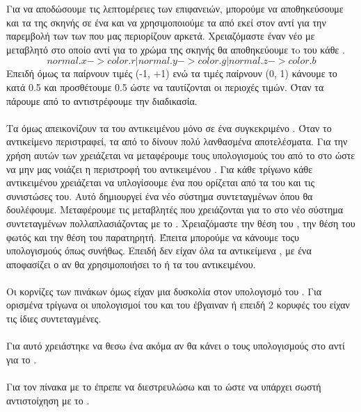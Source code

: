 \documentclass[11pt]{scrartcl} %
\begin{document}
Για να αποδώσουμε τις λεπτομέρειες των επιφανειών, μπορούμε να αποθηκεύσουμε και τα  της σκηνής σε ένα 
 και να χρησιμοποιούμε τα  από εκεί στον  αντί για την παρεμβολή των
 των  που μας περιορίζουν αρκετά. Χρειαζόμαστε έναν νέο  με μεταβλητό 
στο οποίο αντί για το χρώμα της σκηνής θα αποθηκεύουμε τo  του κάθε . 
$$ normal.x -> color.r | normal.y -> color.g | normal.z -> color.b $$
Επειδή όμως τα  παίρνουν τιμές (-1, +1) ενώ τα  τιμές παίρνουν (0, 1) κάνουμε  το 
κατά 0.5 και προσθέτουμε 0.5 ώστε να ταυτίζονται οι περιοχές τιμών. Όταν τα πάρουμε από το  αντιστρέφουμε την διαδικασία.
\\\\
Τα  όμως απεικονίζουν τα  του αντικειμένου μόνο σε ένα συγκεκριμένο . Όταν το αντικείμενο
περιστραφεί, τα  από το  δίνουν πολύ λανθασμένα αποτελέσματα.
Για την χρήση αυτών των  χρειάζεται να μεταφέρουμε τους υπολογισμούς του  από το 
 στο  ώστε να μην μας νοιάζει η περιστροφή του αντικειμένου \cite{Bump}. 
Για κάθε τρίγωνο κάθε αντικειμένου χρειάζεται να υπλογίσουμε ένα  που ορίζεται από τα  
του και τις  συνιστώσες του. Αυτό δημιουργεί ένα νέο σύστημα συντεταγμένων όπου θα δουλέφουμε.
\clearpage
Μεταφέρουμε τις μεταβλητές που χρειάζονται για το  στο νέο σύστημα συντεταγμένων πολλαπλασιάζοντας με
το . Χρειαζόμαστε την θέση του , την θέση του φωτός και την θέση του παρατηρητή.
Έπειτα μπορούμε να κάνουμε τοςυ υπολογισμούς όπως συνήθως. Επειδή δεν είχαν όλα τα αντικείμενα , με ένα 
αποφασίζει ο  αν θα χρησιμοποιήσει το  ή τα  του αντικειμένου.
\\\\
Οι κορνίζες των πινάκων όμως είχαν μια δυσκολία στον υπολογισμό του . Για ορισμένα τρίγωνα οι υπολογισμοί του
 και του  έβγαιναν  ή  επειδή 2 κορυφές του είχαν τις ίδιες  συντεταγμένες.
\\\\ Για αυτό χρειάστηκε να θεσω ένα ακόμα  αν θα κάνει ο  τους υπολογισμούς στο  αντί για το
.
\\\\
Για τον πίνακα με το  έπρεπε να διεστρευλώσω και το  ώστε να υπάρχει σωστή αντιστοίχηση με
το .
\end{document}
